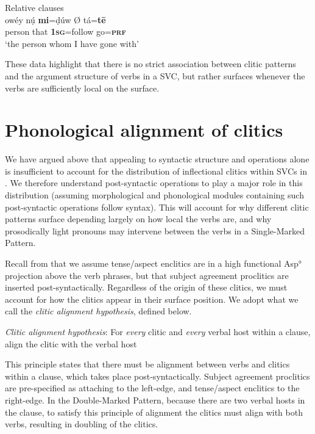 \documentclass[output=paper]{langsci/langscibook}
\begin{document}
\ea\label{ex:rolle:46}
{Relative clauses} \\
\gll  owéy     nụ́     \textbf{mi}=ḍúw Ø tá=\textbf{tē}\\
     person    that    \textbf{\textsc{1sg}}=follow  { }  go=\textbf{\textsc{prf}}\\
\glt ‘the person whom I have gone with’
\z

These data highlight that there is no strict association between clitic patterns and the argument structure of verbs in a SVC, but rather surfaces whenever the verbs are sufficiently local on the surface. 

\section{Phonological alignment of clitics} 

We have argued above that appealing to syntactic structure and operations alone is insufficient to account for the distribution of inflectional clitics within SVCs in . We therefore understand post-syntactic operations to play a major role in this distribution (assuming morphological and phonological modules containing such post-syntactic operations follow syntax). This will account for why different clitic patterns surface depending largely on how local the verbs are, and why prosodically light pronouns may intervene between the verbs in a Single-Marked Pattern. 

Recall from  that we assume tense/aspect enclitics are in a high functional Asp° projection above the verb phrases, but that subject agreement proclitics are inserted post-syntactically. Regardless of the origin of these clitics, we must account for how the clitics appear in their surface position. We adopt what we call the \textit{clitic alignment hypothesis}, defined below. 


\ea\label{ex:rolle:47}
{\textit{Clitic alignment hypothesis}: For \textit{every} clitic and \textit{every} verbal host within a clause, align the clitic with the verbal host}
\z

This principle states that there must be alignment between verbs and clitics within a clause, which takes place post-syntactically. Subject agreement proclitics are pre-specified as attaching to the left-edge, and tense/aspect enclitics to the right-edge. In the Double-Marked Pattern, because there are two verbal hosts in the clause, to satisfy this principle of alignment the clitics must align with both verbs, resulting in doubling of the clitics. 
\end{document}

